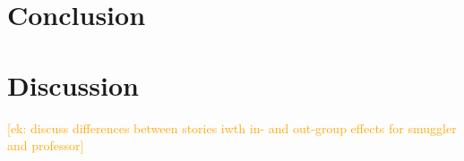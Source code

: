 \documentclass[10pt,letterpaper]{article}
\newcommand{\ek}[1]{\textcolor{Orange}{[ek: #1]}}
\begin{document}
\section{Conclusion}

\section{Discussion}
\ek{discuss differences between stories iwth in- and out-group effects for smuggler and professor}




\setlength{\bibleftmargin}{.125in}
\setlength{\bibindent}{-\bibleftmargin}





\end{document}
